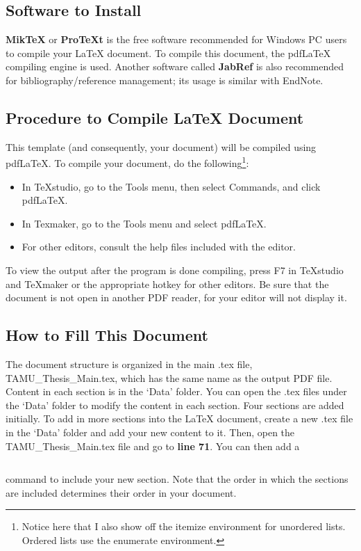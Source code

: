\subsection*{Software to Install}

\textbf{MikTeX} or \textbf{ProTeXt} is the free software recommended for Windows PC users to
compile your \LaTeX{} document. To compile this document, the pdfLaTeX compiling engine
is used. Another software called \textbf{JabRef} is also recommended for bibliography/reference management; its usage is similar with EndNote.

\subsection*{Procedure to Compile \LaTeX{} Document}

This template (and consequently, your document) will be compiled using pdfLaTeX. To compile your document, do the following\footnote{Notice here that I also show off the itemize environment for unordered lists. Ordered lists use the enumerate environment.}:

\begin{itemize}
	\item In TeXstudio, go to the Tools menu, then select Commands, and click pdfLaTeX.
	
	\item In Texmaker, go to the Tools menu and select pdfLaTeX.
	
	\item For other editors, consult the help files included with the editor.
\end{itemize}

To view the output after the program is done compiling, press F7 in TeXstudio and TeXmaker or the appropriate hotkey for other editors. Be sure that the document is not open in another PDF reader, for your editor will not display it.

\subsection{How to Fill This Document}
The document structure is organized in the main .tex file, TAMU\_Thesis\_Main.tex,
which has the same name as the output PDF file. Content in each section is in the `Data' folder. You can open the .tex files under the `Data' folder to modify the content in each section. Four sections
are added initially. To add in more sections into the \LaTeX{} document, create a new .tex file in the `Data' folder and add your new content to it. Then, open the
TAMU\_Thesis\_Main.tex file and go to \textbf{line 71}. You can then add a \begin{verbatim}\end{verbatim} command to include your new section. Note that the order in which the sections are included determines their order in your document.

